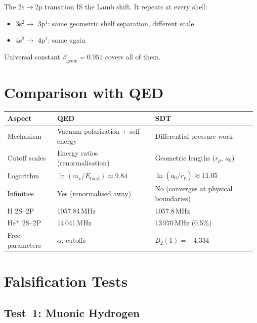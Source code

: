 The 2s$\to$2p transition IS the Lamb shift.  It repeats at every shell:
\begin{itemize}
  \item 3s$^2 \to$ 3p$^1$: same geometric shelf separation, different scale
  \item 4s$^2 \to$ 4p$^1$: same again
\end{itemize}

Universal constant $\beta_{\text{geom}} = 0.951$ covers all of them.


\section{Comparison with QED}

\begin{center}
\begin{tabular}{lll}
\hline
\textbf{Aspect} & \textbf{QED} & \textbf{SDT} \\
\hline
Mechanism & Vacuum polarisation + self-energy & Differential pressure-work \\
Cutoff scales & Energy ratios (renormalisation) & Geometric lengths ($r_p$, $a_0$) \\
Logarithm & $\ln(m_e/E_{\text{bind}}) \approx 9.84$ & $\ln(a_0/r_p) \approx 11.05$ \\
Infinities & Yes (renormalised away) & No (converges at physical boundaries) \\
H 2S--2P & 1057.84\,MHz & 1057.8\,MHz \\
He$^+$ 2S--2P & 14\,041\,MHz & 13\,970\,MHz (0.5\%) \\
Free parameters & $\alpha$, cutoffs & $B_2(1) = -4.334$ \\
\hline
\end{tabular}
\end{center}


\section{Falsification Tests}

\subsection{Test~1: Muonic Hydrogen}

